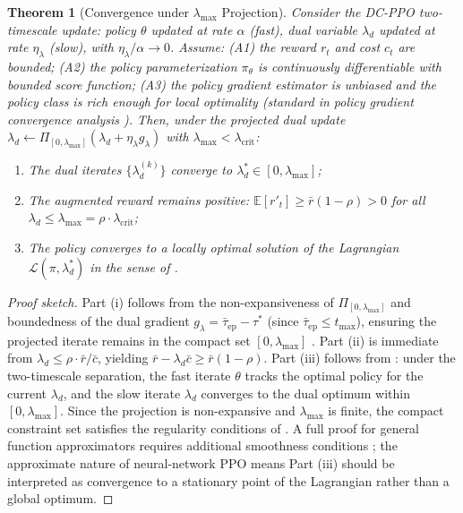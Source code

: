 \documentclass[journal]{IEEEtran}
\newtheorem{theorem}{Theorem}
\newcommand{\ld}{\lambda_d}
\begin{document}
\begin{theorem}[Convergence under $\lambda_{\max}$ Projection]
\label{thm:convergence}
Consider the DC-PPO two-timescale update:
policy $\theta$ updated at rate $\alpha$ (fast), dual variable
$\ld$ updated at rate $\eta_\lambda$ (slow), with
$\eta_\lambda / \alpha \to 0$.
Assume: (A1) the reward $r_t$ and cost $c_t$ are bounded;
(A2) the policy parameterization $\pi_\theta$ is continuously
differentiable with bounded score function;
(A3) the policy gradient estimator is unbiased and the policy
class is rich enough for local optimality
(standard in policy gradient convergence analysis
\cite{agarwal2021theory}).
Then, under the projected dual update
$\ld \leftarrow \Pi_{[0,\lambda_{\max}]}(\ld + \eta_\lambda g_\lambda)$
with $\lambda_{\max} < \lambda_{\text{crit}}$:
\begin{enumerate}
  \item[(i)] The dual iterates $\{\ld^{(k)}\}$ converge to
    $\ld^* \in [0, \lambda_{\max}]$;
  \item[(ii)] The augmented reward remains positive:
    $\mathbb{E}[r'_t] \ge \bar{r}(1 - \rho) > 0$
    for all $\ld \le \lambda_{\max} = \rho \cdot \lambda_{\text{crit}}$;
  \item[(iii)] The policy converges to a locally optimal solution
    of the Lagrangian $\mathcal{L}(\pi, \ld^*)$
    in the sense of \cite{tessler2019rcpo}.
\end{enumerate}
\end{theorem}
\begin{proof}[Proof sketch]
Part (i) follows from the non-expansiveness of $\Pi_{[0,\lambda_{\max}]}$
and boundedness of the dual gradient
$g_\lambda = \bar{\tau}_{\text{ep}} - \tau^*$
(since $\bar{\tau}_{\text{ep}} \le t_{\max}$), ensuring the
projected iterate remains in the compact set $[0, \lambda_{\max}]$
\cite{altman1999cmdp}.
Part (ii) is immediate from $\ld \le \rho \cdot \bar{r}/\bar{c}$,
yielding $\bar{r} - \ld \bar{c} \ge \bar{r}(1-\rho)$.
Part (iii) follows from \cite[Theorem~2]{tessler2019rcpo}:
under the two-timescale separation, the fast iterate $\theta$
tracks the optimal policy for the current $\ld$, and the slow
iterate $\ld$ converges to the dual optimum within
$[0, \lambda_{\max}]$.
Since the projection is non-expansive and $\lambda_{\max}$
is finite, the compact constraint set satisfies the regularity
conditions of \cite{tessler2019rcpo}.
A full proof for general function approximators
requires additional smoothness conditions
\cite{agarwal2021theory,tessler2019rcpo};
the approximate nature of neural-network PPO means
Part (iii) should be interpreted as convergence to a
stationary point of the Lagrangian rather than a global optimum.
\end{proof}
\end{document}
